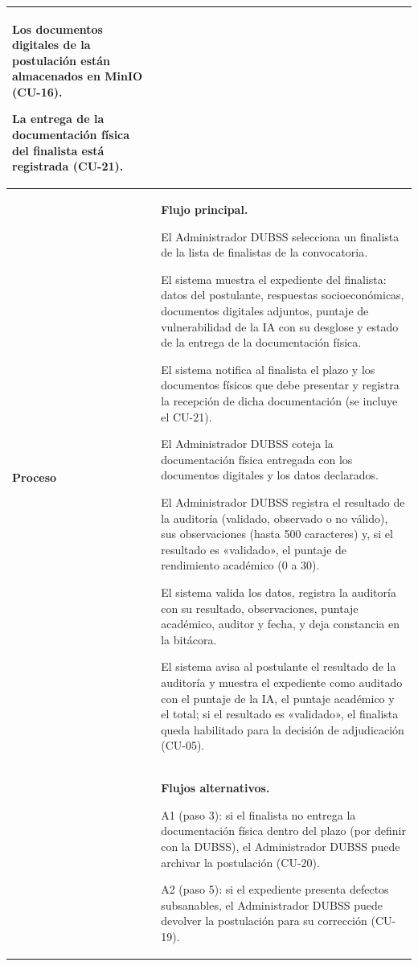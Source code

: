\begin{longtable}{>{\raggedright\arraybackslash}p{2.9cm} >{\raggedright\arraybackslash}p{12.6cm}}
\begin{cuvin}
    \item Los documentos digitales de la postulación están almacenados en MinIO (CU-16).
    \item La entrega de la documentación física del finalista está registrada (CU-21).
\end{cuvin} \\
\midrule
\textbf{Proceso} & \textbf{Flujo principal.}
\begin{cupasos}
    \item El Administrador DUBSS selecciona un finalista de la lista de finalistas de la convocatoria.
    \item El sistema muestra el expediente del finalista: datos del postulante, respuestas socioeconómicas, documentos digitales adjuntos, puntaje de vulnerabilidad de la IA con su desglose y estado de la entrega de la documentación física.
    \item El sistema notifica al finalista el plazo y los documentos físicos que debe presentar y registra la recepción de dicha documentación (se incluye el CU-21).
    \item El Administrador DUBSS coteja la documentación física entregada con los documentos digitales y los datos declarados.
    \item El Administrador DUBSS registra el resultado de la auditoría (validado, observado o no válido), sus observaciones (hasta 500 caracteres) y, si el resultado es «validado», el puntaje de rendimiento académico (0 a 30).
    \item El sistema valida los datos, registra la auditoría con su resultado, observaciones, puntaje académico, auditor y fecha, y deja constancia en la bitácora.
    \item El sistema avisa al postulante el resultado de la auditoría y muestra el expediente como auditado con el puntaje de la IA, el puntaje académico y el total; si el resultado es «validado», el finalista queda habilitado para la decisión de adjudicación (CU-05).
\end{cupasos} \\
 & \textbf{Flujos alternativos.}
\begin{cuvin}
    \item A1 (paso 3): si el finalista no entrega la documentación física dentro del plazo (por definir con la DUBSS), el Administrador DUBSS puede archivar la postulación (CU-20).
    \item A2 (paso 5): si el expediente presenta defectos subsanables, el Administrador DUBSS puede devolver la postulación para su corrección (CU-19).

\end{cuvin}
\end{longtable}
